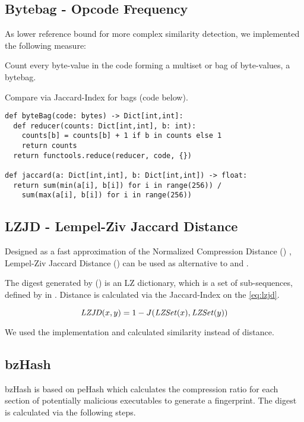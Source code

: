 \documentclass[../main.tex]{subfiles}
\begin{document}
\subsection{Bytebag - Opcode Frequency \label{sec:bytebag}}
As lower reference bound for more complex similarity detection, we implemented the following measure:

\begin{ol}
  \item Count every byte-value in the code forming a multiset or bag of byte-values, a bytebag.
  \item Compare via Jaccard-Index for bags (code below).
\end{ol}

\begin{lstlisting}[style=pymd]
def byteBag(code: bytes) -> Dict[int,int]:
  def reducer(counts: Dict[int,int], b: int):
    counts[b] = counts[b] + 1 if b in counts else 1
    return counts
  return functools.reduce(reducer, code, {})

def jaccard(a: Dict[int,int], b: Dict[int,int]) -> float:
  return sum(min(a[i], b[i]) for i in range(256)) /
    sum(max(a[i], b[i]) for i in range(256))
\end{lstlisting}

\subsection{LZJD - Lempel-Ziv Jaccard Distance \label{sec:lzjd}}
Designed as a fast approximation of the Normalized Compression Distance () \cite{raff2017alternative}, Lempel-Ziv Jaccard Distance () can be used as alternative to  and  \cite{raff2018lempel}.

The digest generated by  () is an LZ dictionary, which is a set of sub-sequences, defined by  in \cite{raff2017alternative}. Distance is calculated via the Jaccard-Index  on the  \eqref{eq:lzjd}.

\begin{equation}
  \mbox{\textit{LZJD}}(x,y) = 1 - J(\mbox{\textit{LZSet}}(x), \mbox{\textit{LZSet}}(y))
  \label{eq:lzjd}
\end{equation}

We used the \cite{raff2019pylzjd} implementation and calculated similarity instead of distance.

\subsection{bzHash \label{sec:bz}}
bzHash is based on peHash\cite{wicherski2009pehash} which calculates the compression ratio for each section of potentially malicious executables to generate a fingerprint. The digest is calculated via the following steps.
\end{document}
